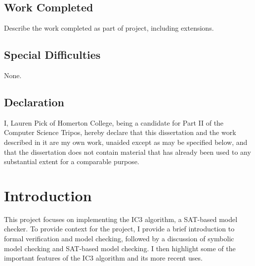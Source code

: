 \documentclass[12pt,a4paper,twoside,openright]{report}
\begin{document}
\section*{Work Completed}

Describe the work completed as part of project, including extensions.

\section*{Special Difficulties}

None.
 
\newpage
\section*{Declaration}

I, Lauren Pick of Homerton College, being a candidate for Part II of the Computer
Science Tripos, hereby declare
that this dissertation and the work described in it are my own work,
unaided except as may be specified below, and that the dissertation
does not contain material that has already been used to any substantial
extent for a comparable purpose.

\bigskip
{}

\medskip
{}

\tableofcontents





\pagestyle{headings}

\chapter{Introduction}

This project focuses on implementing the IC3 algorithm, a SAT-based model checker. 
To provide context for the project,
I provide a brief introduction to formal verification and model checking, followed
by a discussion of symbolic model checking and SAT-based model checking.
I then highlight some of the important features of the IC3 algorithm and its more
recent uses.

\end{document}
